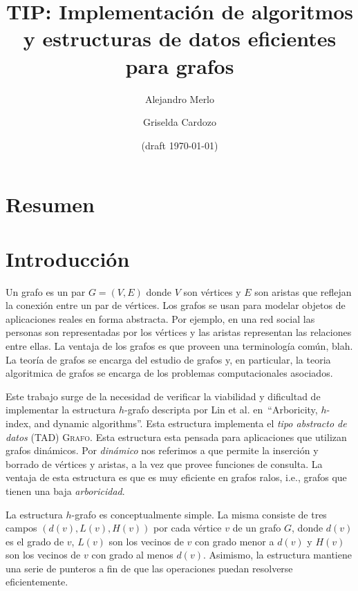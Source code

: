 \documentclass[a4paper,12pt]{article}
\newcommand{\Grafo}{\textsc{Grafo}\xspace}
\begin{document}
\title{TIP:  Implementación de algoritmos y estructuras de datos eficientes para grafos}

\author{Alejandro Merlo \and Griselda Cardozo}
\date{(draft \today)} %

\maketitle

\tableofcontents

\section{Resumen}
\label{sec:resumen}


\section{Introducción}
\label{sec:introduccion}

Un grafo es un par $G = (V, E)$ donde $V$ son vértices y $E$ son aristas que reflejan la conexión entre un par de vértices.  Los grafos se usan para modelar objetos de aplicaciones reales en forma abstracta.  Por ejemplo, en una red social las personas son representadas por los vértices y las aristas representan las relaciones entre ellas.  La ventaja de los grafos es que proveen una terminología común, blah.  La teoría de grafos se encarga del estudio de grafos y, en particular, la teoria algoritmica de grafos se encarga de los problemas computacionales asociados.


Este trabajo surge de la necesidad de verificar la viabilidad y dificultad de implementar la estructura $h$-grafo descripta por Lin et al. en~\cite{}``Arboricity, $h$-index, and dynamic algorithms''.   Esta estructura implementa el \emph{tipo abstracto de datos} (TAD) \Grafo.  Esta estructura esta pensada para aplicaciones que utilizan grafos dinámicos.  Por \emph{dinámico} nos referimos a que permite la inserción y borrado de vértices y aristas, a la vez que provee funciones de consulta.  La ventaja de esta estructura es que es muy eficiente en grafos ralos, i.e., grafos que tienen una baja \emph{arboricidad}.  

La estructura $h$-grafo es conceptualmente simple.  La misma consiste de tres campos $(d(v), L(v), H(v))$ por cada vértice $v$ de un grafo $G$, donde $d(v)$ es el grado de $v$, $L(v)$ son los vecinos de $v$ con grado menor a $d(v)$ y $H(v)$ son los vecinos de $v$ con grado al menos $d(v)$.  Asimismo, la estructura mantiene una serie de punteros a fin de que las operaciones puedan resolverse eficientemente.  
\end{document}
